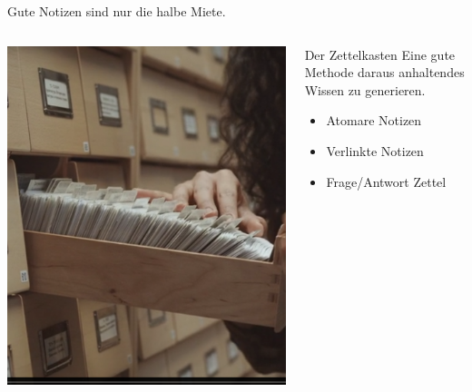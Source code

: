 \begin{frame}{Gute Notizen sind nur die halbe Miete. }
    \begin{columns}
        \begin{column}{0.4\textwidth}
            \includegraphics[width=\textwidth]{graphics/Zettelkasten.png}
        \end{column}
        \begin{column}[t]{0.6\textwidth}   
            \vspace{-3.5cm}
            \begin{block}{Der Zettelkasten}
                Eine gute Methode daraus anhaltendes Wissen zu generieren.
                \begin{itemize}
                    \item Atomare Notizen
                    \item Verlinkte Notizen
                    \item Frage/Antwort Zettel
                \end{itemize} 
            \end{block}                     
        \end{column}        
    \end{columns}    
\end{frame}

